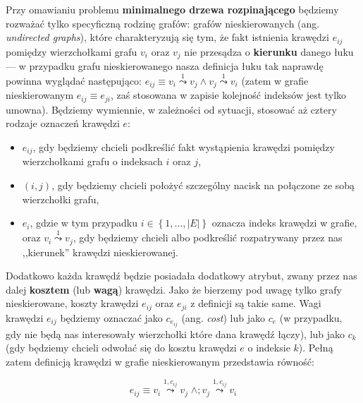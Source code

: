 Przy omawianiu problemu \textbf{minimalnego drzewa rozpinającego} będziemy rozważać tylko specyficzną rodzinę grafów: grafów nieskierowanych (ang. \textit{undirected graphs}), które charakteryzują się tym, że fakt istnienia krawędzi $e_{ij}$ pomiędzy wierzchołkami grafu $v_{i}$ oraz $v_{j}$ nie przesądza o \textbf{kierunku} danego łuku --- w przypadku grafu nieskierowanego nasza definicja łuku tak naprawdę powinna wyglądać następująco: $e_{ij} \equiv v_{i} \overset{1}{\leadsto} v_{j} \wedge v_{j} \overset{1}{\leadsto} v_{i}$ (zatem w grafie nieskierowanym $e_{ij} \equiv e_{ji}$, zaś stosowana w zapisie kolejność indeksów jest tylko umowna). Będziemy wymiennie, w zależności od sytuacji, stosować aż cztery rodzaje oznaczeń krawędzi $e$:
\begin{itemize}
	\item $e_{ij}$, gdy będziemy chcieli podkreślić fakt wystąpienia krawędzi pomiędzy wierzchołkami grafu o indeksach $i$ oraz $j$,
	\item $\left( i, j \right)$, gdy będziemy chcieli położyć szczególny nacisk na połączone ze sobą wierzchołki grafu,
	\item $e_{i}$, gdzie w tym przypadku $i \in \left\{ 1, \dots, \left| E \right| \right\}$ oznacza indeks krawędzi w grafie, oraz $v_{i} \overset{1}{\leadsto} v_{j}$, gdy będziemy chcieli albo podkreślić rozpatrywany przez nas ,,kierunek'' krawędzi nieskierowanej.
\end{itemize}
Dodatkowo każda krawędź będzie posiadała dodatkowy atrybut, zwany przez nas dalej \textbf{kosztem} (lub \textbf{wagą}) krawędzi. Jako że bierzemy pod uwagę tylko grafy nieskierowane, koszty krawędzi $e_{ij}$ oraz $e_{ji}$ z definicji są takie same. Wagi krawędzi $e_{ij}$ będziemy oznaczać jako $c_{e_{ij}}$ (ang. \textit{cost}) lub jako $c_{e}$ (w przypadku, gdy nie będą nas interesowały wierzchołki które dana krawędź łączy), lub jako $c_{k}$ (gdy będziemy chcieli odwołać się do kosztu krawędzi $e$ o indeksie $k$). Pełną zatem definicją krawędzi w grafie nieskierowanym przedstawia równość:

\begin{equation}
e_{ij} \equiv v_{i} \overset{1, c_{ij}}{\leadsto} v_{j} \; \wedge ; v_{j} \overset{1, c_{ij}}{\leadsto} v_{i}
\end{equation}

